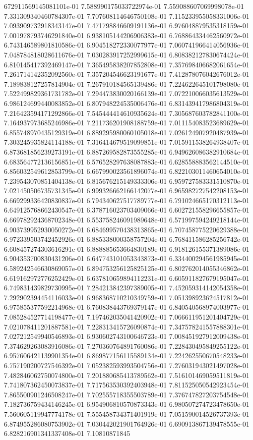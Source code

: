 672911569145081101e-01	7.588990175033722974e-01	7.559088607069998078e-01	7.331309340460784307e-01	7.707608114646750108e-01	7.115233955058331006e-01	7.093909732918343147e-01	7.471798846609191136e-01	6.976048879535318159e-01	7.001978793746291840e-01	6.938105144206906383e-01	6.768864334462560972e-01	6.743146589801810586e-01	6.904518272330077977e-01	7.060741966414056936e-01	7.048784818028611676e-01	7.030283917252999615e-01	6.808382127830674424e-01	6.810145417392469147e-01	7.365495838207852808e-01	7.357698406682061654e-01	7.261714142352092560e-01	7.357204546623191677e-01	7.412878076042676012e-01	7.189838127257814904e-01	7.267910184565139486e-01	7.224622645101798080e-01	7.522499829361731782e-01	7.294473830020166139e-01	7.072210066035613529e-01	6.986124699440083852e-01	6.807948224535006476e-01	6.831439417986804319e-01	7.216423594171292866e-01	7.545444414610935624e-01	7.305687603782841100e-01	7.164937973685246986e-01	7.211736201908188759e-01	7.011154083523689629e-01	6.855748970435129319e-01	6.889295980060105018e-01	7.026124907920487939e-01	7.303245935824114188e-01	7.316414679519099851e-01	7.015911538264938407e-01	6.873681856239273191e-01	6.887269582873555285e-01	6.949626086382910684e-01	6.683564772136156851e-01	6.576528297638087883e-01	6.628558883562144510e-01	6.856032549612853799e-01	6.667990023561896074e-01	6.822103011460654010e-01	7.239543070851404138e-01	6.815676215149333306e-01	6.959727583331510870e-01	7.021450506735731345e-01	6.999326662166142077e-01	6.965982727542208153e-01	6.669299336420830837e-01	6.794340627517789777e-01	6.791024665170312113e-01	6.649125768662430547e-01	6.378716023703409066e-01	6.602721558296655857e-01	6.669782924368702348e-01	6.553758246091989648e-01	6.571997594249218144e-01	6.903739952930050272e-01	6.684699570438313865e-01	6.707458775220629388e-01	6.972339503742452926e-01	6.885338000358757204e-01	6.768411586285256742e-01	6.608457274303616291e-01	6.888885653664830189e-01	6.918126155371389086e-01	6.904353700830431206e-01	6.647743101053343873e-01	6.334400294561985945e-01	6.589242546630869057e-01	6.894753256125825125e-01	6.802762014055346862e-01	6.619162972776252429e-01	6.637810659894112231e-01	6.605911827679195047e-01	6.749831439829730995e-01	7.284213842397389005e-01	7.452059314142054358e-01	7.292902394454116033e-01	6.968368710210349759e-01	7.051398923624517812e-01	6.975855377592214968e-01	6.760838443769379147e-01	6.840540568974003977e-01	7.085284527714198477e-01	7.197462035041420902e-01	7.066611951201404729e-01	7.021078411201887581e-01	7.228313415726090874e-01	7.347578241557888301e-01	7.027212549940546893e-01	6.930602743100646723e-01	7.008451927912009438e-01	7.374629263083916086e-01	7.270360764891760086e-01	7.228430495849255122e-01	6.957606421139901354e-01	6.869877156115589134e-01	7.224262550670548233e-01	6.757190200727546392e-01	7.052382593993504756e-01	7.276031943021497028e-01	7.482846062750074800e-01	7.201880685413789562e-01	7.516101469059511819e-01	7.741807362450073837e-01	7.717563530392403948e-01	7.811525050542923454e-01	7.865500901246508247e-01	7.702555718355503789e-01	7.376747827203754548e-01	7.182736759434146245e-01	6.954906810570873343e-01	6.980507274723478650e-01	7.560605119947774178e-01	7.555458734371401919e-01	7.051590014526737393e-01	6.874955286080753902e-01	7.030442021901764926e-01	6.690913867139478555e-01	6.828216901341337408e-01	7.10810871845